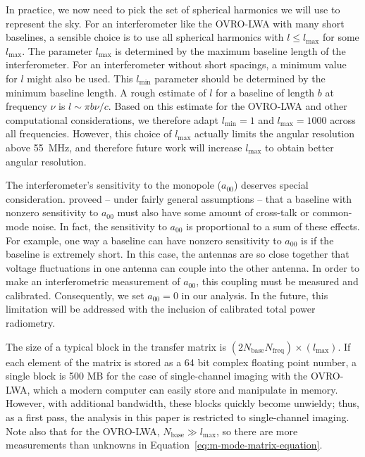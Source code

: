 \documentclass[twocolumn]{aastex61}
\begin{document}
In practice, we now need to pick the set of spherical harmonics we will use to represent the sky.
For an interferometer like the OVRO-LWA with many short baselines, a sensible choice is to use all
spherical harmonics with $l\le l_\text{max}$ for some $l_\text{max}$. The parameter $l_\text{max}$
is determined by the maximum baseline length of the interferometer.  For an interferometer without
short spacings, a minimum value for $l$ might also be used. This $l_\text{min}$ parameter should be
determined by the minimum baseline length. A rough estimate of $l$ for a baseline of length $b$ at
frequency $\nu$ is $l \sim \pi b\nu/c$. Based on this estimate for the OVRO-LWA and other
computational considerations, we therefore adapt $l_\text{min}=1$ and $l_\text{max}=1000$ across all
frequencies. However, this choice of $l_\text{max}$ actually limits the angular resolution above
55~MHz, and therefore future work will increase $l_\text{max}$ to obtain better angular resolution.

The interferometer's sensitivity to the monopole ($a_{00}$) deserves special consideration.
\citet{2016ApJ...826..116V} proveed -- under fairly general assumptions -- that a baseline with
nonzero sensitivity to $a_{00}$ must also have some amount of cross-talk or common-mode noise.  In
fact, the sensitivity to $a_{00}$ is proportional to a sum of these effects. For example, one way a
baseline can have nonzero sensitivity to $a_{00}$ is if the baseline is extremely short. In this
case, the antennas are so close together that voltage fluctuations in one antenna can couple into the
other antenna. In order to make an interferometric measurement of $a_{00}$, this coupling must be
measured and calibrated. Consequently, we set $a_{00}=0$ in our analysis. In the future, this
limitation will be addressed with the inclusion of calibrated total power radiometry.

The size of a typical block in the transfer matrix is
$(2N_\text{base}N_\text{freq})\times(l_\text{max})$. If each element of the matrix is stored as a
64 bit complex floating point number, a single block is 500 MB for the case of single-channel
imaging with the OVRO-LWA, which a modern computer can easily store and manipulate in memory.
However, with additional bandwidth, these blocks quickly become unwieldy; thus, as a first pass, the
analysis in this paper is restricted to single-channel imaging. Note also that for the OVRO-LWA,
$N_\text{base} \gg l_\text{max}$, so there are more measurements than unknowns in
Equation~\ref{eq:m-mode-matrix-equation}.
\end{document}
